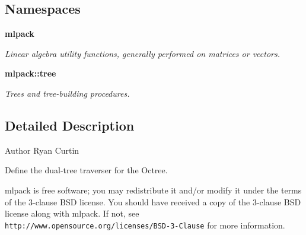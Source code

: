 \subsection*{Namespaces}
\begin{DoxyCompactItemize}
\item 
 \textbf{ mlpack}
\begin{DoxyCompactList}\small\item\em Linear algebra utility functions, generally performed on matrices or vectors. \end{DoxyCompactList}\item 
 \textbf{ mlpack\+::tree}
\begin{DoxyCompactList}\small\item\em Trees and tree-\/building procedures. \end{DoxyCompactList}\end{DoxyCompactItemize}


\subsection{Detailed Description}
\begin{DoxyAuthor}{Author}
Ryan Curtin
\end{DoxyAuthor}
Define the dual-\/tree traverser for the Octree.

mlpack is free software; you may redistribute it and/or modify it under the terms of the 3-\/clause B\+SD license. You should have received a copy of the 3-\/clause B\+SD license along with mlpack. If not, see {\tt http\+://www.\+opensource.\+org/licenses/\+B\+S\+D-\/3-\/\+Clause} for more information. 